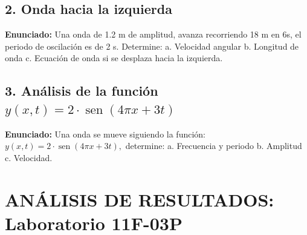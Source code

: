 \documentclass[12pt, letterpaper]{article}
\begin{document}
\subsection*{2. Onda hacia la izquierda}
\noindent \textbf{Enunciado:} Una onda de 1.2 m de amplitud, avanza recorriendo 18 m en 6s, el periodo de oscilación es de 2 s. Determine: a. Velocidad angular b. Longitud de onda c. Ecuación de onda si se desplaza hacia la izquierda.


\subsection*{3. Análisis de la función $y(x,t) = 2 \cdot \operatorname{sen}(4\pi x + 3t)$}
\noindent \textbf{Enunciado:} Una onda se mueve siguiendo la función: $y(x,t)=2 \cdot \operatorname{sen}(4\pi x+3t),$ determine: a. Frecuencia y periodo b. Amplitud c. Velocidad.


\newpage
\section*{ANÁLISIS DE RESULTADOS: Laboratorio 11F-03P}
\end{document}
